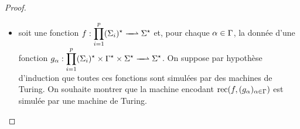 \begin{proof}
\begin{itemize}
    Dans le déroulement d'une telle machine, la première étape assure que
    dans le ruban $S_k$ se trouve la valeur de $f_k(\vec{\varwd})$, et que
    la valeur de sortie est l'image par $g$ des valeurs contenues dans les
    rubans $S_k$, d'où le fait que notre machine simule
    $g\circ(f_1,\ldots,f_p)$.
  \item soit une fonction
    $\makeFunNamePartial{f}{\prod_{i =1}^p \toStAP{i}}{\toStA}$
    et, pour chaque $\alpha \in \Gamma$, la donnée d'une fonction
    $\makeFunNamePartial{g_{\varla}}{\prod_{i = 1}^p
      \toStAP{i}\times\toStB\times\toStA}{\toStA}$.
    On suppose par hypothèse d'induction que toutes ces fonctions sont simulées
    par des machines de Turing. On souhaite montrer que la machine encodant
    $\operatorname{rec}(f,(g_\alpha)_{\alpha \in \Gamma})$ est simulée par une machine de Turing.


\end{itemize}
\end{proof}
